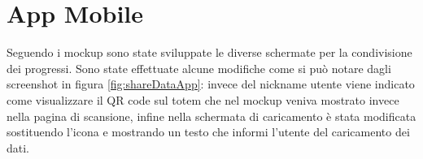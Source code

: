 \section{App Mobile}
Seguendo i mockup sono state sviluppate le diverse schermate per la condivisione dei progressi. Sono state effettuate alcune modifiche come si può notare dagli screenshot in figura \ref{fig:shareDataApp}: invece del nickname utente viene indicato come visualizzare il QR code sul totem che nel mockup veniva mostrato invece nella pagina di scansione, infine nella schermata di caricamento è stata modificata sostituendo l'icona e mostrando un testo che informi l'utente del caricamento dei dati.
\begin{figure}[h]
    \centering
\end{figure}

